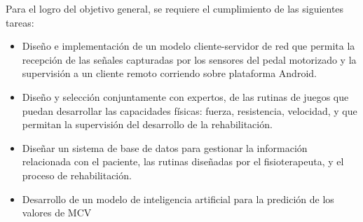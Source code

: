 \begin{introduction}
    \vspace{5pt}
    Para el logro del objetivo general, se requiere el cumplimiento de las siguientes tareas:
    \begin{itemize}
        \item Diseño e implementación de un modelo cliente-servidor de red que permita la
        recepción de las señales capturadas por los sensores del pedal motorizado
        y la supervisión a un cliente remoto corriendo sobre plataforma Android.
        \item  Diseño y selección conjuntamente con expertos, de las rutinas de juegos que
        puedan desarrollar las capacidades físicas: fuerza, resistencia, velocidad, y que
        permitan la supervisión del desarrollo de la rehabilitación.
        \item Diseñar un sistema de base de datos para gestionar la información relacionada con
        el paciente, las rutinas diseñadas por el fisioterapeuta, y el proceso de
        rehabilitación.
        \item Desarrollo de un modelo de inteligencia artificial para la predición de los valores de MCV
    \end{itemize}
\end{introduction}


